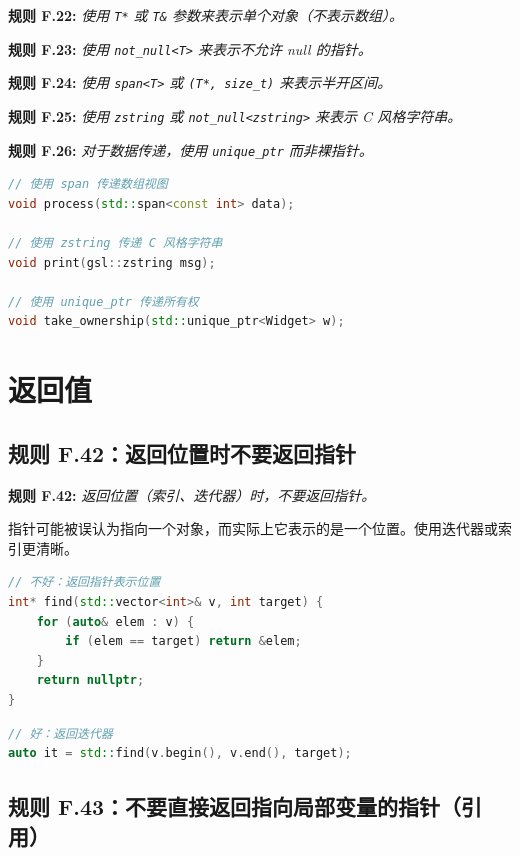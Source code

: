 \textbf{规则 F.22:} \textit{使用 \texttt{T*} 或 \texttt{T\&} 参数来表示单个对象（不表示数组）。}

\textbf{规则 F.23:} \textit{使用 \texttt{not\_null<T>} 来表示不允许 null 的指针。}

\textbf{规则 F.24:} \textit{使用 \texttt{span<T>} 或 \texttt{(T*, size\_t)} 来表示半开区间。}

\textbf{规则 F.25:} \textit{使用 \texttt{zstring} 或 \texttt{not\_null<zstring>} 来表示 C 风格字符串。}

\textbf{规则 F.26:} \textit{对于数据传递，使用 \texttt{unique\_ptr} 而非裸指针。}

\begin{lstlisting}[language=C++]
// 使用 span 传递数组视图
void process(std::span<const int> data);

// 使用 zstring 传递 C 风格字符串
void print(gsl::zstring msg);

// 使用 unique_ptr 传递所有权
void take_ownership(std::unique_ptr<Widget> w);
\end{lstlisting}

\section{返回值}

\subsection{规则 F.42：返回位置时不要返回指针}

\textbf{规则 F.42:} \textit{返回位置（索引、迭代器）时，不要返回指针。}

指针可能被误认为指向一个对象，而实际上它表示的是一个位置。使用迭代器或索引更清晰。

\begin{lstlisting}[language=C++]
// 不好：返回指针表示位置
int* find(std::vector<int>& v, int target) {
    for (auto& elem : v) {
        if (elem == target) return &elem;
    }
    return nullptr;
}
\end{lstlisting}

\begin{lstlisting}[language=C++]
// 好：返回迭代器
auto it = std::find(v.begin(), v.end(), target);
\end{lstlisting}

\subsection{规则 F.43：不要直接返回指向局部变量的指针（引用）}

